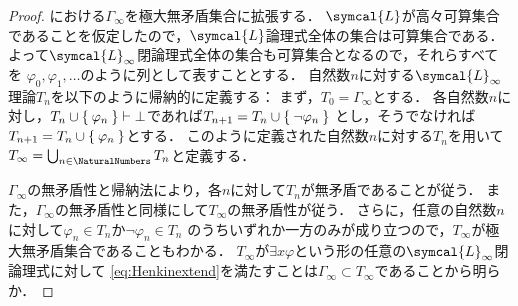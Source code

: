 \begin{proof}
	における\(\Gamma_\infty\)を極大無矛盾集合に拡張する．
	\(\symcal{L}\)が高々可算集合であることを仮定したので，\(\symcal{L}\)論理式全体の集合は可算集合である．
	よって\(\symcal{L}_\infty\)閉論理式全体の集合も可算集合となるので，それらすべてを
	\(\varphi_0, \varphi_1, \dots\)のように列として表すこととする．
	自然数\(n\)に対する\(\symcal{L}_\infty\)理論\(T_n\)を以下のように帰納的に定義する：
	まず，\(T_0 = \Gamma_\infty\)とする．
	各自然数\(n\)に対し，\(T_n \cup \Set{\varphi_n} \vdash \bot\)であれば\(T_{n + 1} = T_n \cup \Set{ \lnot \varphi_n}\)
	とし，そうでなければ\(T_{n + 1} = T_n \cup \Set{\varphi_n}\)とする．
	このように定義された自然数\(n\)に対する\(T_n\)を用いて\(T_\infty = \bigcup_{n \in \NaturalNumbers} T_n\)と定義する．

	\(\Gamma_\infty\)の無矛盾性と帰納法により，各\(n\)に対して\(T_n\)が無矛盾であることが従う．
	また，\(\Gamma_\infty\)の無矛盾性と同様にして\(T_\infty\)の無矛盾性が従う．
	さらに，任意の自然数\(n\)に対して\(\varphi_n \in T_n\)か\(\lnot \varphi_n \in T_n\)
	のうちいずれか一方のみが成り立つので，\(T_\infty\)が極大無矛盾集合であることもわかる．
	\(T_\infty\)が\(\exists x \varphi\)という形の任意の\(\symcal{L}_\infty\)閉論理式に対して
	\cref{eq:Henkinextend}を満たすことは\(\Gamma_\infty \subset T_\infty\)であることから明らか．
\end{proof}


